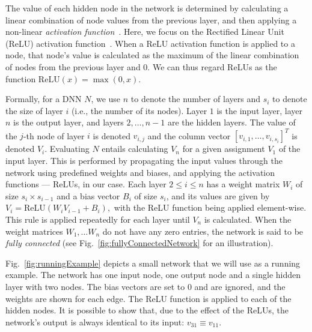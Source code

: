 \documentclass[a4paper]{llncs}
\newcommand{\relu}{\text{ReLU}\xspace{}}
\begin{document}
The value of each hidden node in the network is determined by
calculating a linear combination of node values from the previous
layer, and then applying a non-linear \emph{activation function}~\cite{FoBeCu16}.
Here, we focus on the 
Rectified Linear Unit (ReLU) activation function~\cite{NaHi10}.
 When a ReLU activation function is applied to a node,
that node's value is calculated as
the maximum of the linear combination of nodes from the previous
layer and $0$. We can thus regard ReLUs as the 
function $\relu{}(x) = \max{}(0, x)$.

Formally, for a DNN $N$, we
use $n$ to denote the number of layers and $s_i$ to denote the size of
layer $i$ (i.e., the number of its nodes).
 Layer $1$ is the input layer, layer $n$ is the output layer, and
 layers $2,\ldots,n-1$ are the hidden layers. 
The value of the $j$-th node of layer $i$ is denoted $v_{i,j}$ 
and the column vector $[v_{i,1},\ldots,v_{i,s_i}]^T$ is denoted
$V_i$.
Evaluating $N$ entails calculating $V_n$ for a given assignment $V_1$
of the input layer. This
is performed by propagating the input values through the network
using predefined weights and biases, and applying the activation
functions --- ReLUs, in our case. Each layer $2\leq i\leq n$ has a weight
matrix $W_i$ of size $s_{i}\times s_{i-1}$ and a bias vector $B_i$ of size
$ s_i$, and its values are given by
$
V_i = \relu{}(W_i  V_{i-1} + B_i),
$
with the ReLU
function being applied element-wise. 
This rule is applied repeatedly for each layer until $V_n$ is
calculated.
When the weight matrices $W_1,\ldots
W_n$ do not have any zero entries, the network is said to be \emph{fully
  connected} (see Fig.~\ref{fig:fullyConnectedNetwork} for an illustration).

Fig.~\ref{fig:runningExample} depicts a small network that we will use
as a running example.
The network has one input node, one
output node and a single hidden layer with two nodes. 
The bias vectors are set
to $0$ and are ignored, and the weights are shown for each edge.
The ReLU function is
applied to each of the hidden nodes.
It is possible to show that, due to the effect of the ReLUs,
the network's output is always identical to its input:
$v_{31}\equiv v_{11}$.
\end{document}
